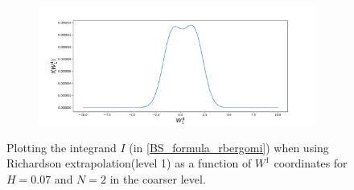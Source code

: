 \documentclass[11pt]{article}
\begin{document}
\begin{figure}[h!]
\begin{subfigure}[b]{0.4\textwidth}
 		\caption{}
 		\label{fig:sub4}
 	\end{subfigure}
 	\hfill
 	\begin{subfigure}[b]{0.4\textwidth}
 		\centering
 		\includegraphics[width=1\linewidth]{./figures/integrand_richardson_plotting_rBergomi/N_2/W_1/Bergomi_integrand_rich_level1_K_1_H_007_y4f_N_2}
 		\caption{}
 		\label{fig:sub4}
 	\end{subfigure}
 	\caption{Plotting the integrand $I$ (in \eqref{BS_formula_rbergomi}) when using Richardson extrapolation(level 1) as a function of $W^1$ coordinates for $H=0.07$ and $N=2$ in the coarser level.}
 	\label{fig:Integrand_rich_level1_H_007_N_2_W_1}
 \end{figure}
 
\end{document}
